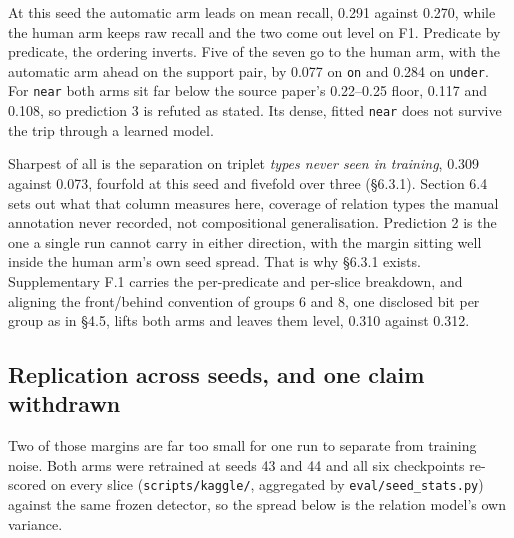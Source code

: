 At this seed the automatic arm leads on mean recall, 0.291 against 0.270, while the human arm keeps raw recall and the two come out level on F1. Predicate by predicate, the ordering inverts. Five of the seven go to the human arm, with the automatic arm ahead on the support pair, by 0.077 on \texttt{on} and 0.284 on \texttt{under}. For \texttt{near} both arms sit far below the source paper's 0.22--0.25 floor, 0.117 and 0.108, so prediction 3 is refuted as stated. Its dense, fitted \texttt{near} does not survive the trip through a learned model.

Sharpest of all is the separation on triplet \textit{types never seen in training}, 0.309 against 0.073, fourfold at this seed and fivefold over three (\S{}6.3.1). Section 6.4 sets out what that column measures here, coverage of relation types the manual annotation never recorded, not compositional generalisation. Prediction 2 is the one a single run cannot carry in either direction, with the margin sitting well inside the human arm's own seed spread. That is why \S{}6.3.1 exists. Supplementary F.1 carries the per-predicate and per-slice breakdown, and aligning the front/behind convention of groups 6 and 8, one disclosed bit per group as in \S{}4.5, lifts both arms and leaves them level, 0.310 against 0.312.

\subsection{Replication across seeds, and one claim withdrawn}

Two of those margins are far too small for one run to separate from training noise. Both arms were retrained at seeds 43 and 44 and all six checkpoints re-scored on every slice (\texttt{scripts/kaggle/}, aggregated by \texttt{eval/seed\_\allowbreak{}stats.py}) against the same frozen detector, so the spread below is the relation model's own variance.

